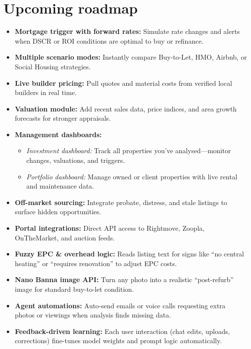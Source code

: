 \documentclass[11pt,a4paper]{article}
\begin{document}
\section*{Upcoming roadmap}
\begin{itemize}
  \item \textbf{Mortgage trigger with forward rates:} Simulate rate changes and alerts when DSCR or ROI conditions are optimal to buy or refinance.
  \item \textbf{Multiple scenario modes:} Instantly compare Buy-to-Let, HMO, Airbnb, or Social Housing strategies.
  \item \textbf{Live builder pricing:} Pull quotes and material costs from verified local builders in real time.
  \item \textbf{Valuation module:} Add recent sales data, price indices, and area growth forecasts for stronger appraisals.
  \item \textbf{Management dashboards:}  
    \begin{itemize}
      \item \textit{Investment dashboard:} Track all properties you’ve analysed—monitor changes, valuations, and triggers.  
      \item \textit{Portfolio dashboard:} Manage owned or client properties with live rental and maintenance data.
    \end{itemize}
  \item \textbf{Off-market sourcing:} Integrate probate, distress, and stale listings to surface hidden opportunities.
  \item \textbf{Portal integrations:} Direct API access to Rightmove, Zoopla, OnTheMarket, and auction feeds.
  \item \textbf{Fuzzy EPC \& overhead logic:} Reads listing text for signs like “no central heating” or “requires renovation” to adjust EPC costs.
  \item \textbf{Nano Banna image API:} Turn any photo into a realistic “post-refurb” image for standard buy-to-let condition.
  \item \textbf{Agent automations:} Auto-send emails or voice calls requesting extra photos or viewings when analysis finds missing data.
  \item \textbf{Feedback-driven learning:} Each user interaction (chat edits, uploads, corrections) fine-tunes model weights and prompt logic automatically.
\end{itemize}
\end{document}
